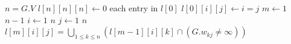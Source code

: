 \documentclass[]{article}
\begin{document}
\begin{codebox}
	\li $n = G.V$
	\li $l[n][n][n] \leftarrow 0$
	\li \For each entry in $l[0]$
	\li \Do $l[0][i][j] \leftarrow i = j$ \End
	\li \For $m \leftarrow 1$ \To $n-1$
	\li \Do \For $i \leftarrow 1$ \To $n$
	\li \Do \For $j \leftarrow 1$ \To $n$
	\li \Do $l[m][i][j] = \underset{1 \le k \le n}\bigcup (l[m-1][i][k] \cap (G.w_{kj} \neq \infty))$
 	\End \End \End
\end{codebox}
\end{document}
